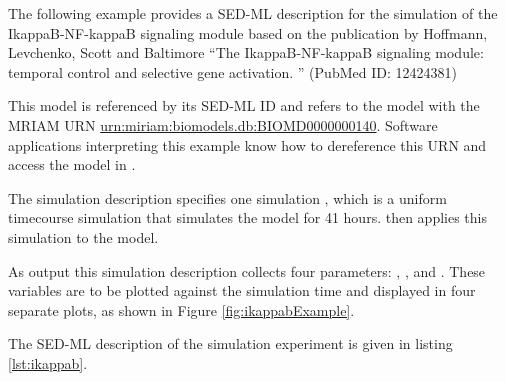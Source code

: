The following example provides a SED-ML description for the simulation of the IkappaB-NF-kappaB signaling module based on the publication by Hoffmann, Levchenko, Scott and  Baltimore ``The IkappaB-NF-kappaB signaling module: temporal control and selective gene activation. '' (PubMed ID: 12424381)

This model is referenced by its SED-ML ID   and refers to the model with the MRIAM URN \url{urn:miriam:biomodels.db:BIOMD0000000140}. 
Software applications interpreting this example know how to dereference this URN and access the model in \biom \citep{N+06}.

The simulation description specifies one simulation , which is a uniform timecourse simulation that simulates the model for 41 hours.  then applies this simulation to the model. 

As output this simulation description collects four parameters: , ,  and . These variables are to be plotted against the simulation time and displayed in four separate plots, as shown in Figure \ref{fig:ikappabExample}. 
%
%

The SED-ML description of the simulation experiment is given in listing \ref{lst:ikappab}.

